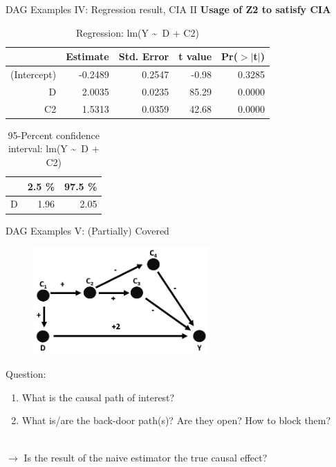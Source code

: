 \documentclass{beamer}\usepackage[]{graphicx}\usepackage[]{color}
\begin{document}
\begin{frame}[fragile]{DAG Examples IV: Regression result, CIA II}
\textbf{Usage of Z2 to satisfy CIA}
\begin{table}[ht]
\centering
\begingroup\small
\begin{tabular}{rrrrr}
  \hline
 & Estimate & Std. Error & t value & Pr($>$$|$t$|$) \\ 
  \hline
(Intercept) & -0.2489 & 0.2547 & -0.98 & 0.3285 \\ 
  D & 2.0035 & 0.0235 & 85.29 & 0.0000 \\ 
  C2 & 1.5313 & 0.0359 & 42.68 & 0.0000 \\ 
   \hline
\end{tabular}
\endgroup
\caption{Regression: lm(Y \textasciitilde ~D + C2)} 
\end{table}
\begin{table}[ht]
\centering
\begingroup\small
\begin{tabular}{rrr}
  \hline
 & 2.5 \% & 97.5 \% \\ 
  \hline
D & 1.96 & 2.05 \\ 
   \hline
\end{tabular}
\endgroup
\caption{95-Percent confidence interval: lm(Y \textasciitilde ~D + C2)} 
\end{table}

\end{frame}


\begin{frame}{DAG Examples V: (Partially) Covered}
\\[1em]
\begin{figure}
\centering
\includegraphics[width=0.6\textwidth]{Graphics/5.TwoBack-doorpaths-Covered.png}
\end{figure}
Question:
\begin{enumerate}
\item What is the causal path of interest?
\item What is/are the back-door path(s)? Are they open? How to block them?
\end{enumerate}
\\[1em]
$\rightarrow$ Is the result of the naive estimator the true causal effect?
\end{frame}
\end{document}
